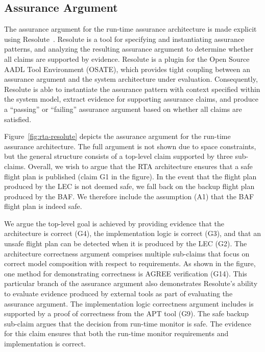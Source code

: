 \subsection{Assurance Argument}

The assurance argument for the run-time assurance architecture is made explicit using Resolute~\cite{resolute}.  Resolute is a tool for specifying and instantiating assurance patterns, and analyzing the resulting assurance argument to determine whether all claims are supported by evidence.  Resolute is a plugin for the Open Source AADL Tool Environment (OSATE), which provides tight coupling between an assurance argument and the system architecture under evaluation.  Consequently, Resolute is able to instantiate the assurance pattern with context specified within the system model, extract evidence for supporting assurance claims, and produce a ``passing'' or ``failing'' assurance argument based on whether all claims are satisfied.

Figure~\ref{fig:rta-resolute} depicts the assurance argument for the run-time assurance architecture.  The full argument is not shown due to space constraints, but the general structure consists of a top-level claim supported by three sub-claims.  Overall, we wish to argue that the RTA architecture ensures that a safe flight plan is published (claim G1 in the figure).  In the event that the flight plan produced by the LEC is not deemed safe, we fall back on the backup flight plan produced by the BAF.  We therefore include the assumption (A1) that the BAF flight plan is indeed safe.

We argue the top-level goal is achieved by providing evidence that the architecture is correct (G4), the implementation logic is correct (G3), and that an unsafe flight plan can be detected when it is produced by the LEC (G2).  The architecture correctness argument comprises multiple sub-claims that focus on correct model composition with respect to requirements.  As shown in the figure, one method for demonstrating correctness is AGREE verification (G14).  This particular branch of the assurance argument also demonstrates Resolute's ability to evaluate evidence produced by external tools as part of evaluating the assurance argument.
%
The implementation logic correctness argument includes is supported by a proof of correctness from the APT tool (G9). The safe backup sub-claim argues that the decision from run-time monitor is safe. The evidence for this claim ensures that both the run-time monitor requirements and implementation is correct. 

